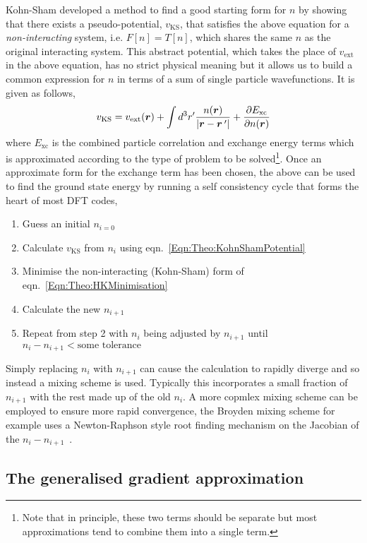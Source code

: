 Kohn-Sham developed a method to find a good starting form for $n$ by showing that there exists a pseudo-potential, $v_{\textrm{KS}}$, that satisfies the above equation for a \emph{non-interacting} system, i.e. $F[n] = T[n]$, which shares the same $n$ as the original interacting system. This abstract potential, which takes the place of $v_{\textrm{ext}}$ in the above equation, has no strict physical meaning but it allows us to build a common expression for $n$ in terms of a sum of single particle wavefunctions. It is given as follows,
\begin{equation}
\label{Eqn:Theo:KohnShamPotential}
v_{\textrm{KS}} = v_{\textrm{ext}}(\vect{r}) + \int d^3r^\prime\frac{n(\vect{r})}{|\vect{r}-\vect{r}^{\hspace{2px}\prime}|} + \frac{\partial E_{\textrm{xc}}}{\partial n(\vect{r})}
\end{equation}
where $E_{\textrm{xc}}$ is the combined particle correlation and exchange energy terms which is approximated according to the type of problem to be solved\footnote{Note that in principle, these two terms should be separate but most approximations tend to combine them into a single term.}.  Once an approximate form for the exchange term has been chosen, the above can be used to find the ground state energy by running a self consistency cycle that forms the heart of most \ac{DFT} codes,
\begin{enumerate}
    \item Guess an initial $n_{i=0}$
    \item Calculate $v_{\textrm{KS}}$ from $n_{i}$ using eqn.~\ref{Eqn:Theo:KohnShamPotential}
    \item Minimise the non-interacting (Kohn-Sham) form of eqn.~\ref{Eqn:Theo:HKMinimisation}
    \item Calculate the new $n_{i+1}$
    \item Repeat from step 2 with $n_i$ being adjusted by $n_{i+1}$ until $n_{i} - n_{i+1} < \textrm{some tolerance}$
\end{enumerate}
Simply replacing $n_{i}$ with $n_{i+1}$ can cause the calculation to rapidly diverge and so instead a mixing scheme is used. Typically this incorporates a small fraction of $n_{i+1}$ with the rest made up of the old $n_{i}$. A more copmlex mixing scheme can be employed to ensure more rapid convergence, the Broyden mixing scheme for example uses a Newton-Raphson style root finding mechanism on the Jacobian of the $n_{i} - n_{i+1}$~\cite{Broyden1965}.


\subsection{The generalised gradient approximation}

